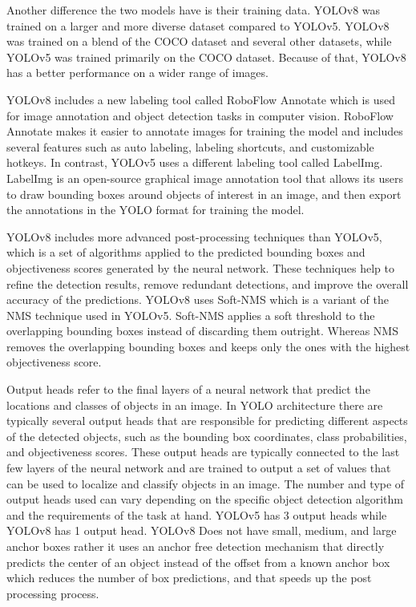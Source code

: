 \documentclass[10pt,twocolumn,letterpaper]{article}
\begin{document}
Another difference the two models have is their training data. YOLOv8 was trained on a larger and more diverse dataset compared to YOLOv5. YOLOv8 was trained on a blend of the COCO dataset and several other datasets, while YOLOv5 was trained primarily on the COCO dataset. Because of that, YOLOv8 has a better performance on a wider range of images.

YOLOv8 includes a new labeling tool called RoboFlow Annotate which is used for image annotation and object detection tasks in computer vision. RoboFlow Annotate makes it easier to annotate images for training the model and includes several features such as auto labeling, labeling shortcuts, and customizable hotkeys. In contrast, YOLOv5 uses a different labeling tool called LabelImg. LabelImg is an open-source graphical image annotation tool that allows its users to draw bounding boxes around objects of interest in an image, and then export the annotations in the YOLO format for training the model.

YOLOv8 includes more advanced post-processing techniques than YOLOv5, which is a set of algorithms applied to the predicted bounding boxes and objectiveness scores generated by the neural network. These techniques help to refine the detection results, remove redundant detections, and improve the overall accuracy of the predictions. YOLOv8 uses Soft-NMS which is a variant of the NMS technique used in YOLOv5. Soft-NMS applies a soft threshold to the overlapping bounding boxes instead of discarding them outright. Whereas NMS removes the overlapping bounding boxes and keeps only the ones with the highest objectiveness score.

Output heads refer to the final layers of a neural network that predict the locations and classes of objects in an image. In YOLO architecture there are typically several output heads that are responsible for predicting different aspects of the detected objects, such as the bounding box coordinates, class probabilities, and objectiveness scores. These output heads are typically connected to the last few layers of the neural network and are trained to output a set of values that can be used to localize and classify objects in an image. The number and type of output heads used can vary depending on the specific object detection algorithm and the requirements of the task at hand. YOLOv5 has 3 output heads while YOLOv8 has 1 output head. YOLOv8 Does not have small, medium, and large anchor boxes rather it uses an anchor free detection mechanism that directly predicts the center of an object instead of the offset from a known anchor box which reduces the number of box predictions, and that speeds up the post processing process.
\end{document}
